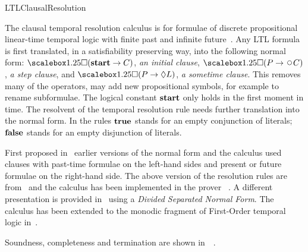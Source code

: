 \begin{entry}{LTLClausalResolution}
 \begin{clarifications}
The clausal temporal resolution calculus is for formulae of discrete propositional
linear-time temporal logic with finite past and infinite
future~\cite{Prior@OUP1967,Kamp@PhD1968,Gabbay+Pnueli+Shelah+Stavi@POPL1980}.
Any LTL formula is first translated, in a satisfiability preserving way, into the
following  normal form: 
$\Always(\lstart \rightarrow C)$, \emph{an initial clause},
$\Always(P \rightarrow \Next C)$, \emph{a step clause}, and
$\Always(P \rightarrow \sometime L)$, \emph{a sometime clause}.
%
This removes many of the operators, may add new propositional 
symbols, for example to rename subformulae.
%
The logical constant ${\bf start}$ only holds in the first moment in time. 
%
The resolvent of the temporal resolution rule needs further translation into
the normal form. 
%
In the rules ${\bf true}$ stands for an empty conjunction of literals; ${\bf false}$
stands for an empty disjunction of literals.
 \end{clarifications}

\begin{history}
First proposed in~\cite{Fis90-resolve} earlier versions of 
the normal form and the calculus used clauses with past-time formulae
on the left-hand sides and present or future formulae on the
right-hand side. The above version of the resolution rules are
from~\cite{FDP01} and the calculus has been implemented in the prover
\TRPpp~\cite{HustadtKonev2003a}. 
A different presentation is provided in~\cite{DFK02}
using a {\em Divided Separated Normal Form}.
The calculus has been extended to the monodic fragment of First-Order 
temporal logic in~.
\end{history}

\begin{technicalities}
Soundness, completeness and termination are shown in~~\cite{FDP01}.
\end{technicalities}



\end{entry}
